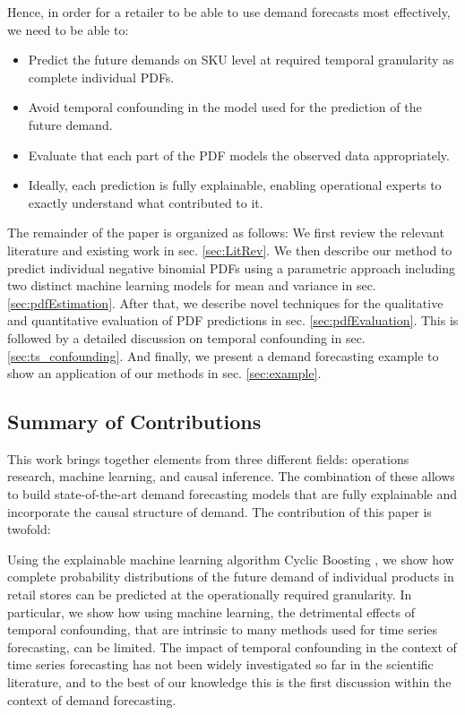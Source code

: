 \documentclass[BCOR=1mm, DIV=calc,10pt,
twoside=true,
twocolumn,
headings=normal]{scrartcl}
\begin{document}
Hence, in order for a retailer to be able to use demand forecasts most effectively, we need to be able to:
\begin{itemize}
	\item {Predict the future demands on SKU level at required temporal granularity as complete individual PDFs.}
	\item {Avoid temporal confounding in the model used for the prediction of the future demand.}
	\item {Evaluate that each part of the PDF models the observed data appropriately.}
	\item {Ideally, each prediction is fully explainable, enabling operational experts to exactly understand what contributed to it.}
\end{itemize}

The remainder of the paper is organized as follows: We first review the relevant literature and existing work in sec. \ref{sec:LitRev}. We then describe our method to predict individual negative binomial PDFs using  a parametric approach including two distinct machine learning models for mean and variance in sec. \ref{sec:pdfEstimation}. After that, we describe novel techniques for the qualitative and quantitative evaluation of PDF predictions in sec. \ref{sec:pdfEvaluation}. This is followed by a detailed discussion on temporal confounding in sec. \ref{sec:ts_confounding}. And finally, we present a demand forecasting example to show an application of our methods in sec. \ref{sec:example}.

\subsection*{Summary of Contributions}

This work brings together elements from three different fields: operations research, machine learning, and causal inference. The combination of these allows to build state-of-the-art demand forecasting models that are fully explainable and incorporate the causal structure of demand. The contribution of this paper is twofold:

Using the explainable machine learning algorithm Cyclic Boosting \cite{Wick2019}, we show how complete probability distributions of the future demand of individual products in retail stores can be predicted at the operationally required granularity. In particular, we show how using machine learning, the detrimental effects of temporal confounding, that are intrinsic to many methods used for time series forecasting, can be limited. The impact of temporal confounding in the context of time series forecasting has not been widely investigated so far in the scientific literature, and to the best of our knowledge this is the first discussion within the context of demand forecasting.
\end{document}
